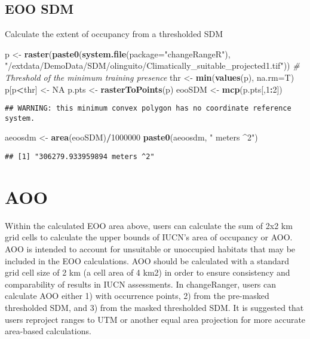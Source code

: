 \documentclass[
]{article}
\newenvironment{Shaded}{\begin{snugshade}}{\end{snugshade}}
\newcommand{\CommentTok}[1]{\textcolor[rgb]{0.56,0.35,0.01}{\textit{#1}}}
\newcommand{\DataTypeTok}[1]{\textcolor[rgb]{0.13,0.29,0.53}{#1}}
\newcommand{\DecValTok}[1]{\textcolor[rgb]{0.00,0.00,0.81}{#1}}
\newcommand{\KeywordTok}[1]{\textcolor[rgb]{0.13,0.29,0.53}{\textbf{#1}}}
\newcommand{\NormalTok}[1]{#1}
\newcommand{\OperatorTok}[1]{\textcolor[rgb]{0.81,0.36,0.00}{\textbf{#1}}}
\newcommand{\OtherTok}[1]{\textcolor[rgb]{0.56,0.35,0.01}{#1}}
\newcommand{\StringTok}[1]{\textcolor[rgb]{0.31,0.60,0.02}{#1}}
\begin{document}
\hypertarget{eoo-sdm}{%
\subsection{EOO SDM}\label{eoo-sdm}}

Calculate the extent of occupancy from a thresholded SDM

\begin{Shaded}
\begin{Highlighting}[]
\NormalTok{p <-}\StringTok{ }\KeywordTok{raster}\NormalTok{(}\KeywordTok{paste0}\NormalTok{(}\KeywordTok{system.file}\NormalTok{(}\DataTypeTok{package=}\StringTok{"changeRangeR"}\NormalTok{), }\StringTok{"/extdata/DemoData/SDM/olinguito/Climatically_suitable_projected1.tif"}\NormalTok{))}
\CommentTok{# Threshold of the minimum training presence}
\NormalTok{thr <-}\StringTok{ }\KeywordTok{min}\NormalTok{(}\KeywordTok{values}\NormalTok{(p), }\DataTypeTok{na.rm=}\NormalTok{T)}
\NormalTok{p[p}\OperatorTok{<}\NormalTok{thr] <-}\StringTok{ }\OtherTok{NA}
\NormalTok{p.pts <-}\StringTok{ }\KeywordTok{rasterToPoints}\NormalTok{(p)}
\NormalTok{eooSDM <-}\StringTok{ }\KeywordTok{mcp}\NormalTok{(p.pts[,}\DecValTok{1}\OperatorTok{:}\DecValTok{2}\NormalTok{])}
\end{Highlighting}
\end{Shaded}

\begin{verbatim}
## WARNING: this minimum convex polygon has no coordinate reference system.
\end{verbatim}

\begin{Shaded}
\begin{Highlighting}[]
\NormalTok{aeoosdm <-}\StringTok{ }\KeywordTok{area}\NormalTok{(eooSDM)}\OperatorTok{/}\DecValTok{1000000}
\KeywordTok{paste0}\NormalTok{(aeoosdm, }\StringTok{" meters ^2"}\NormalTok{)}
\end{Highlighting}
\end{Shaded}

\begin{verbatim}
## [1] "306279.933959894 meters ^2"
\end{verbatim}

\hypertarget{aoo}{%
\section{AOO}\label{aoo}}

Within the calculated EOO area above, users can calculate the sum of 2x2
km grid cells to calculate the upper bounds of IUCN's area of occupancy
or AOO. AOO is intended to account for unsuitable or unoccupied habitats
that may be included in the EOO calculations. AOO should be calculated
with a standard grid cell size of 2 km (a cell area of 4 km2) in order
to ensure consistency and comparability of results in IUCN assessments.
In changeRanger, users can calculate AOO either 1) with occurrence
points, 2) from the pre-masked thresholded SDM, and 3) from the masked
thresholded SDM. It is suggested that users reproject ranges to UTM or
another equal area projection for more accurate area-based calculations.
\end{document}
